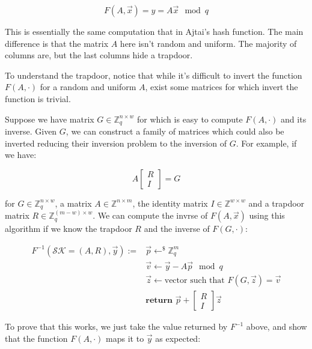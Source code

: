 \documentclass[a4paper]{article}
\begin{document}
$$
F(A, \overrightarrow{x}) = y = A\overrightarrow{x} \mod q
$$

This is essentially the same computation that in Ajtai's hash
function. The main difference is that the matrix $A$ here isn't random
and uniform. The majority of columns are, but the last columns hide a
trapdoor.

To understand the trapdoor, notice that while it's difficult to invert
the function $F(A, \cdot)$ for a random and uniform $A$, exist some
matrices for which invert the function is trivial.

Suppose we have matrix $G \in \mathbb{Z}_q^{n \times w}$ for which is
easy to compute $F(A, \cdot)$ and its inverse. Given $G$, we can
construct a family of matrices which could also be inverted reducing
their inversion problem to the inversion of $G$. For example, if we
have:

$$
A\begin{bmatrix}R\\I\end{bmatrix} = G
$$

for $G \in \mathbb{Z}_q^{n \times w}$, a matrix $A \in \mathbb{Z}^{n
  \times m}$, the identity matrix $I \in \mathbb{Z}^{w \times w}$ and
a trapdoor matrix $R \in \mathbb{Z}_q^{(m-w) \times w}$. We can
compute the invrse of $F(A, \overrightarrow{x})$ using this algorithm
if we know the trapdoor $R$ and the inverse of $F(G, \cdot)$:

\begin{equation*}
 \begin{split}
F^{-1}(\mathcal{SK}=(A, R), \overrightarrow{y}) :=& \overrightarrow{p}
\leftarrow^{\$} \mathbb{Z}_q^m\\ &\overrightarrow{v} \leftarrow
\overrightarrow{y} - A\overrightarrow{p} \mod q\\ & \overrightarrow{z}
\leftarrow \textrm{vector\ such\ that\ } F(G,
\overrightarrow{z})=\overrightarrow{v}\\ &\textbf{return\ }\overrightarrow{p}
+ \begin{bmatrix}R\\I\end{bmatrix}\overrightarrow{z}
 \end{split}
 \end{equation*}

 To prove that this works, we just take the value returned by $F^{-1}$
 above, and show that the function $F(A, \cdot)$ maps it to
 $\overrightarrow{y}$ as expected:
 
\end{document}
